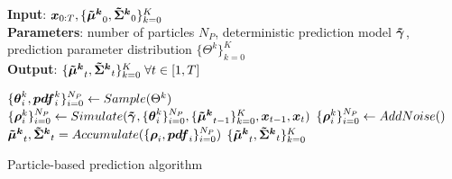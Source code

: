 \begin{algorithm}[H]
\setstretch{\algorithmstretch}

\textbf{Input}: $\x_{0:T}, \{\muped[k]_0, \sigmaped[k]_0\}_{k=0}^K$ \\
\textbf{Parameters}: number of particles $N_P$, deterministic prediction model $\distmodeldet[]$, prediction parameter distribution $\{\Theta^k\}_{k=0}^K$ \\
\textbf{Output}: $\{\muped[k]_t, \sigmaped[k]_t\}_{k=0}^K \; \forall t \in [1, T]$
\begin{algorithmic}[1]
		\State $\{ \pparam[k]_i, \boldsymbol{pdf}^k_i \}_{i=0}^{N_P} \gets Sample(\Theta^k)$
		\State $\{ \pstate[k]_i \}_{i=0}^{N_P} \gets Simulate(\distmodeldet[], \{ \pparam[k]_i \}_{i=0}^{N_P}, \{ \muped[k]_{t-1} \}_{k=0}^K, \x_{t-1}, \x_t)$
		\State $\{ \pstate[k]_i \}_{i=0}^{N_P} \gets AddNoise()$
	\EndFor
	\State $\muped[k]_t, \sigmaped[k]_t = Accumulate(\{ \pstate[]_i, \boldsymbol{pdf}_i \}_{i=0}^{N_P})$
\EndFor
\Return $\{ \muped[k]_t, \sigmaped[k]_t \}_{k=0}^K$
\end{algorithmic}
\caption{Particle-based prediction algorithm}
\label{alg:particle_simulation}
\end{algorithm}

